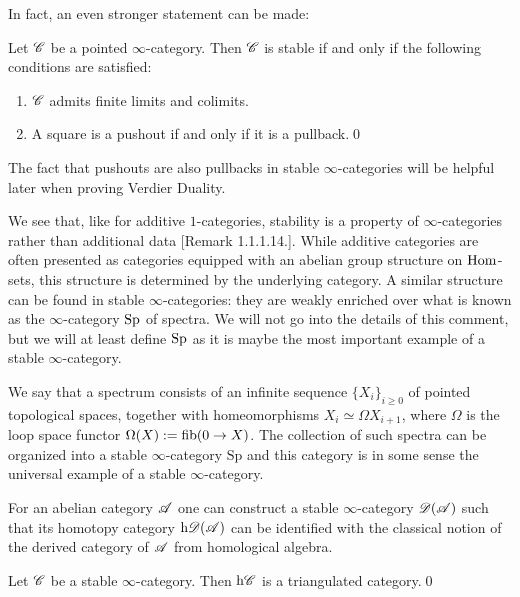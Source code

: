\documentclass[../../thesis.tex]{subfiles}
\begin{document}
In fact, an even stronger statement can be made:
\begin{proposition}
    Let $\mathscr{C}$ be a pointed $\infty$-category.
    Then $\mathscr{C}$ is stable if and only if the following conditions are satisfied:
    \begin{enumerate}
        \item $\mathscr{C}$ admits finite limits and colimits.
        \item A square is a pushout if and only if it is a pullback.\qed
    \end{enumerate}
\end{proposition}
The fact that pushouts are also pullbacks in stable $\infty$-categories will be helpful later when proving Verdier Duality.


We see that, like for additive $1$-categories, stability is a property of $\infty$-categories rather than additional data \cite{HA}[Remark 1.1.1.14.].
While additive categories are often presented as categories equipped with an abelian group structure on $\mathrm{Hom}$-sets, this structure is determined by the underlying category.
A similar structure can be found in stable $\infty$-categories: they are weakly enriched over what is known as the $\infty$-category $\mathrm{Sp}$ of spectra.
We will not go into the details of this comment, but we will at least define $\mathrm{Sp}$ as it is maybe the most important example of a stable $\infty$-category.
\begin{example}[{\cite[Example 1.1.1.11.]{HA}}]
    We say that a spectrum consists of an infinite sequence $\{X_i\}_{i \geq 0}$ of pointed topological spaces, together with homeomorphisms $X_i \simeq \Omega X_{i+1}$, where $\Omega$ is the loop space functor $\Omega(X) : = \operatorname{fib}(0 \to X)$.
    The collection of such spectra can be organized into a stable $\infty$-category $\mathrm{Sp}$ and this category is in some sense the universal example of a stable $\infty$-category.
\end{example}
\begin{example}[{\cite[Example 1.1.1.12.]{HA}}]
    For an abelian category $\mathscr{A}$ one can construct a stable $\infty$-category $\mathscr{D}(\mathscr{A})$ such that its homotopy category $\mathrm{h}\mathscr{D}(\mathscr{A})$ can be identified with the classical notion of the derived category of $\mathscr{A}$ from homological algebra.
\end{example}
\begin{theorem}[{\cite[Theorem 1.1.2.14.]{HA}}]
    Let $\mathscr{C}$ be a stable $\infty$-category.
    Then $\mathrm{h}\mathscr{C}$ is a triangulated category.\qed
\end{theorem}
\end{document}
